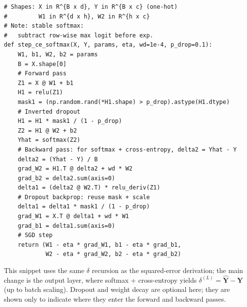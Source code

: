 \begin{tcolorbox}[summarybox, title={Implementation pattern (modern practice): softmax + cross-entropy}]
\footnotesize
\begin{verbatim}
# Shapes: X in R^{B x d}, Y in R^{B x c} (one-hot)
#         W1 in R^{d x h}, W2 in R^{h x c}
# Note: stable softmax:
#   subtract row-wise max logit before exp.
def step_ce_softmax(X, Y, params, eta, wd=1e-4, p_drop=0.1):
    W1, b1, W2, b2 = params
    B = X.shape[0]
    # Forward pass
    Z1 = X @ W1 + b1
    H1 = relu(Z1)
    mask1 = (np.random.rand(*H1.shape) > p_drop).astype(H1.dtype)
    # Inverted dropout
    H1 = H1 * mask1 / (1 - p_drop)
    Z2 = H1 @ W2 + b2
    Yhat = softmax(Z2)
    # Backward pass: for softmax + cross-entropy, delta2 = Yhat - Y
    delta2 = (Yhat - Y) / B
    grad_W2 = H1.T @ delta2 + wd * W2
    grad_b2 = delta2.sum(axis=0)
    delta1 = (delta2 @ W2.T) * relu_deriv(Z1)
    # Dropout backprop: reuse mask + scale
    delta1 = delta1 * mask1 / (1 - p_drop)
    grad_W1 = X.T @ delta1 + wd * W1
    grad_b1 = delta1.sum(axis=0)
    # SGD step
    return (W1 - eta * grad_W1, b1 - eta * grad_b1,
            W2 - eta * grad_W2, b2 - eta * grad_b2)
\end{verbatim}
\normalsize
This snippet uses the same \(\delta\) recursion as the squared\hyp{}error derivation; the main change is the output layer, where softmax + cross\hyp{}entropy yields \(\delta^{(L)}=\hat{\mathbf{Y}}-\mathbf{Y}\) (up to batch scaling). Dropout and weight decay are optional here; they are shown only to indicate where they enter the forward and backward passes.
\end{tcolorbox}



